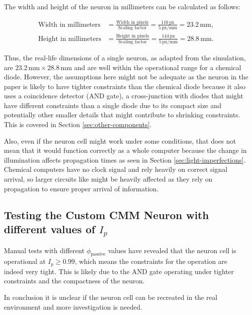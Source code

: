 The width and height of the neuron in millimeters can be calculated as follows:

\begin{align*}
\text{Width in millimeters} &= \frac{\text{Width in pixels}}{\text{Scaling factor}} = \frac{116 \, \text{px}}{5 \, \text{px/mm}} = 23.2 \, \text{mm}, \\
\text{Height in millimeters} &= \frac{\text{Height in pixels}}{\text{Scaling factor}} = \frac{144 \, \text{px}}{5 \, \text{px/mm}} = 28.8 \, \text{mm}.
\end{align*}

Thus, the real-life dimensions of a single neuron, as adapted from the simulation, are $23.2 \, \text{mm} \times 28.8 \, \text{mm}$ and are well within the operational range for a chemical diode. 
However, the assumptions here might not be adequate as the neuron in the paper is likely to have tighter constraints than the chemical diode because it also uses a coincidence detector (AND gate),
a cross-junction with diodes that might have different constraints than a single diode due to its compact size and potentially other smaller details that might contribute to 
shrinking constraints. This is covered in Section \ref{sec:other-components}.



Also, even if the neuron cell might work under some conditions, that does not mean that it would function correctly as a whole computer because 
the change in illumination affects propagation times \citep{reddy1995effect} as seen in Section \ref{sec:light-imperfections}.
Chemical computers have no clock signal and rely heavily on correct signal arrival, so larger circuits like \cite{StovoldJames2019RaGI} 
might be heavily affected as they rely on propagation to ensure proper arrival of information.

\subsection{Testing the Custom CMM Neuron with different values of $I_p$}\label{sec:testing-neuron}
Manual tests with different $\phi_{\text{passive}}$ values have revealed that the neuron cell is operational at \( I_p \geq 0.99 \), which means the constraints for the operation are indeed very tight.
This is likely due to the AND gate operating under tighter constraints and the compactness of the neuron. 

In conclusion it is unclear if the neuron cell can be recreated in the real environment and more investigation is needed.
